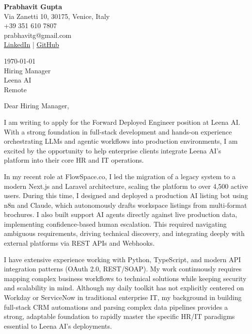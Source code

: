 \documentclass[11pt,a4paper]{article}
\begin{document}
\begin{flushleft}
\textbf{Prabhavit Gupta}\\
Via Zanetti 10, 30175, Venice, Italy\\
+39 351 610 7807\\
prabhavitg@gmail.com\\
\href{https://www.linkedin.com/in/prabhavit/}{LinkedIn} | \href{https://github.com/prab-gupta}{GitHub}
\end{flushleft}

\vspace{2em}

\begin{flushleft}
\today\\
\vspace{1em}
Hiring Manager\\
Leena AI\\
Remote
\end{flushleft}

\vspace{1em}

Dear Hiring Manager,

I am writing to apply for the Forward Deployed Engineer position at Leena AI. With a strong foundation in full-stack development and hands-on experience orchestrating LLMs and agentic workflows into production environments, I am excited by the opportunity to help enterprise clients integrate Leena AI's platform into their core HR and IT operations.

In my recent role at FlowSpace.co, I led the migration of a legacy system to a modern Next.js and Laravel architecture, scaling the platform to over 4,500 active users. During this time, I designed and deployed a production AI listing bot using n8n and Claude, which autonomously drafts workspace listings from multi-format brochures. I also built support AI agents directly against live production data, implementing confidence-based human escalation. This required navigating ambiguous requirements, driving technical discovery, and integrating deeply with external platforms via REST APIs and Webhooks.

I have extensive experience working with Python, TypeScript, and modern API integration patterns (OAuth 2.0, REST/SOAP). My work continuously requires mapping complex business workflows to technical solutions while keeping security and scalability in mind. Although my daily toolkit has not explicitly centered on Workday or ServiceNow in traditional enterprise IT, my background in building full-stack CRM automations and parsing complex data pipelines provides a strong, adaptable foundation to rapidly master the specific HR/IT paradigms essential to Leena AI's deployments. 
\end{document}
